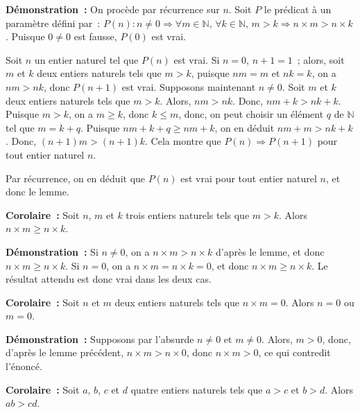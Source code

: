 \noindent\textbf{Démonstration :} On procède par récurrence sur $n$. 
    Soit $P$ le prédicat à un paramètre défini par : $P(n): n \neq 0 \Rightarrow \forall m \in \mathbb{N}, \, \forall k \in \mathbb{N}, \, m > k \Rightarrow n \times m > n \times k$. 
    Puisque $0 \neq 0$ est fausse, $P(0)$ est vrai. 

    Soit $n$ un entier naturel tel que $P(n)$ est vrai. 
    Si $n = 0$, $n+1 = 1$ ; alors, soit $m$ et $k$ deux entiers naturels tels que $m > k$, puisque $n m = m$ et $n k = k$, on a $n m > n k$, donc $P(n+1)$ est vrai. 
    Supposons maintenant $n \neq 0$. 
    Soit $m$ et $k$ deux entiers naturels tels que $m > k$. 
    Alors, $n m > n k$.
    Donc, $n m + k > n k + k$. 
    Puisque $m > k$, on a $m \geq k$, donc $k \leq m$, donc, on peut choisir un élément $q$ de $\mathbb{N}$ tel que $m = k + q$.
    Puisque $n m + k + q \geq n m + k$, on en déduit $n m + m > n k + k$.
    Donc, $(n+1) m > (n+1) k$. 
    Cela montre que $P(n) \Rightarrow P(n+1)$ pour tout entier naturel $n$. 

    Par récurrence, on en déduit que $P(n)$ est vrai pour tout entier naturel $n$, et donc le lemme.

   \done 

\medskip

\noindent\textbf{Corolaire :} Soit $n$, $m$ et $k$ trois entiers naturels tels que $m > k$. 
                               Alors $n \times m \geq n \times k$.

\medskip

\noindent\textbf{Démonstration :} Si $n \neq 0$, on a $n \times m > n \times k$ d'après le lemme, et donc $n \times m \geq n \times k$.
    Si $n = 0$, on a $n \times m = n \times k= 0$, et donc $n \times m \geq n \times k$. 
    Le résultat attendu est donc vrai dans les deux cas.

   \done 

\medskip

\noindent\textbf{Corolaire :} Soit $n$ et $m$ deux entiers naturels tels que $n \times m = 0$. Alors $n = 0$ ou $m = 0$. 

\medskip

\noindent\textbf{Démonstration :} Supposons par l'absurde $n \neq 0$ et $m \neq 0$.
    Alors, $m > 0$, donc, d'après le lemme précédent, $n \times m > n \times 0$, donc $n \times m > 0$, ce qui contredit l'énoncé.

   \done 

\medskip

\noindent\textbf{Corolaire :} Soit $a$, $b$, $c$ et $d$ quatre entiers naturels tels que $a > c$ et $b > d$. 
    Alors $a b > c d$.

